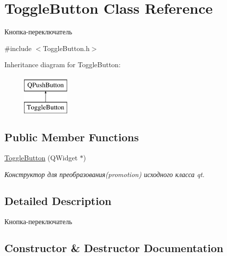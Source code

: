 \hypertarget{class_toggle_button}{}\section{Toggle\+Button Class Reference}
\label{class_toggle_button}


Кнопка-\/переключатель  




{\ttfamily \#include $<$Toggle\+Button.\+h$>$}

Inheritance diagram for Toggle\+Button\+:\begin{figure}[H]
\begin{center}
\leavevmode
\includegraphics[height=2.000000cm]{class_toggle_button}
\end{center}
\end{figure}
\subsection*{Public Member Functions}
\begin{DoxyCompactItemize}
\item 
\hyperlink{class_toggle_button_abf137e4fb0e825ae60e01dc0056f4224}{Toggle\+Button} (Q\+Widget $\ast$)
\begin{DoxyCompactList}\small\item\em Конструктор для преобразования(promotion) исходного класса qt. \end{DoxyCompactList}\end{DoxyCompactItemize}


\subsection{Detailed Description}
Кнопка-\/переключатель 

\subsection{Constructor \& Destructor Documentation}
\mbox{\label{class_toggle_button_abf137e4fb0e825ae60e01dc0056f4224}} 
